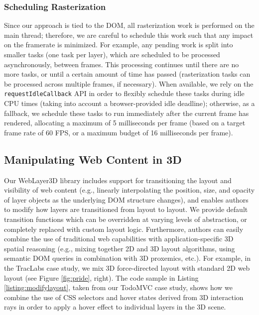 \documentclass[sigconf]{acmart}
\begin{document}
\subsubsection{Scheduling Rasterization}
Since our approach is tied to the DOM, all rasterization work is performed on the main thread; therefore, we are careful to schedule this work such that any impact on the framerate is minimized. For example, any pending work is split into smaller tasks (one task per layer), which are scheduled to be processed asynchronously, between frames. This processing continues until there are no more tasks, or until a certain amount of time has passed (rasterization tasks can be processed across multiple frames, if necessary). When available, we rely on the \verb|requestIdleCallback| API in order to flexibly schedule these tasks during idle CPU times (taking into account a browser-provided idle deadline); otherwise, as a fallback, we schedule these tasks to run immediately after the current frame has rendered, allocating a maximum of 5 milliseconds per frame (based on a target frame rate of 60 FPS, or a maximum budget of 16 milliseconds per frame).


\subsection{Manipulating Web Content in 3D}
Our WebLayer3D library includes support for transitioning the layout and visibility of web content (e.g., linearly interpolating the position, size, and opacity of layer objects as the underlying DOM structure changes), and enables authors to modify how layers are transitioned from layout to layout. We provide default transition functions which can be overridden at varying levels of abstraction, or completely replaced with custom layout logic. Furthermore, authors can easily combine the use of traditional web capabilities with application-specific 3D spatial reasoning (e.g., mixing together 2D and 3D layout algorithms, using semantic DOM queries in combination with 3D proxemics, etc.). For example, in the TracLabs case study, we mix 3D force-directed layout with standard 2D web layout (see Figure \ref{fig:pride}, right). The code sample in Listing \ref{listing:modifylayout}, taken from our TodoMVC case study, shows how we combine the use of CSS selectors and hover states derived from 3D interaction rays in order to apply a hover effect to individual layers in the 3D scene.
\end{document}
